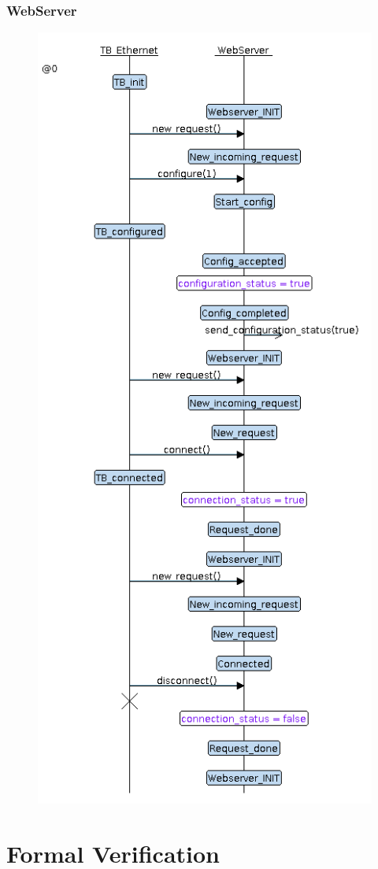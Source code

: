 \documentclass{article}
\begin{document}
\subsubsection{WebServer}
\label{subs:Light Management}
\begin{figure}[h!]
  \centering
  \includegraphics[width = .65\textwidth]{./disconnection_from_ethernet.png}
\end{figure}


\section{Formal Verification}
\label{sec:Formal Verification}
\end{document}
